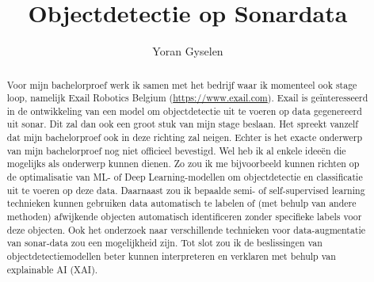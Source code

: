 \documentclass{hogent-article}
\title{Objectdetectie op Sonardata}
\author{Yoran Gyselen}
\begin{document}
\begin{abstract}
  Voor mijn bachelorproef werk ik samen met het bedrijf waar ik momenteel ook stage loop, namelijk Exail Robotics Belgium (\href{https://www.exail.com/}{https://www.exail.com}). Exail is geïnteresseerd in de ontwikkeling van een model om objectdetectie uit te voeren op data gegenereerd uit sonar. Dit zal dan ook een groot stuk van mijn stage beslaan. Het spreekt vanzelf dat mijn bachelorproef ook in deze richting zal neigen. Echter is het exacte onderwerp van mijn bachelorproef nog niet officieel bevestigd. Wel heb ik al enkele ideeën die mogelijks als onderwerp kunnen dienen. Zo zou ik me bijvoorbeeld kunnen richten op de optimalisatie van ML- of Deep Learning-modellen om objectdetectie en classificatie uit te voeren op deze data. Daarnaast zou ik bepaalde semi- of self-supervised learning technieken kunnen gebruiken data automatisch te labelen of (met behulp van andere methoden) afwijkende objecten automatisch identificeren zonder specifieke labels voor deze objecten. Ook het onderzoek naar verschillende technieken voor data-augmentatie van sonar-data zou een mogelijkheid zijn. Tot slot zou ik de beslissingen van objectdetectiemodellen beter kunnen interpreteren en verklaren met behulp van explainable AI (XAI).
\end{abstract}

\tableofcontents



\printbibliography[heading=bibintoc]
\end{document}
